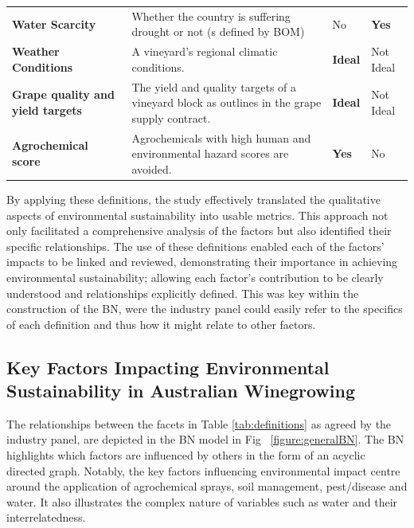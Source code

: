 \begin{table}[h]
\begin{tabular}{@{}llll@{}}
    \textbf{Water Scarcity} & Whether the country is suffering drought or not (s defined by BOM) & No & \textbf{Yes} \\
    \textbf{Weather Conditions} & A vineyard’s regional climatic conditions. & \textbf{Ideal} & Not Ideal \\
    \textbf{Grape quality and yield targets} & The yield and quality targets of a vineyard block as outlines in the grape supply contract. & \textbf{Ideal} & Not Ideal \\
    \textbf{Agrochemical score} & Agrochemicals with high human and environmental hazard scores are avoided. & \textbf{Yes} & No \\ \bottomrule
    \end{tabular}
\end{table}

By applying these definitions, the study effectively translated the qualitative aspects of environmental sustainability into usable metrics. This approach not only facilitated a comprehensive analysis of the factors but also identified their specific relationships. The use of these definitions enabled each of the factors' impacts to be linked and reviewed, demonstrating their importance in achieving environmental sustainability; allowing each factor's contribution to be clearly understood and relationships explicitly defined. This was key within the construction of the BN, were the industry panel could easily refer to the specifics of each definition and thus how it might relate to other factors.

\subsection{Key Factors Impacting Environmental Sustainability in Australian Winegrowing} 

The relationships between the facets in Table \ref{tab:definitions}  as agreed by the industry panel, are depicted in the BN model in Fig ~\ref{figure:generalBN}. The BN highlights which factors are influenced by others in the form of an acyclic directed graph. Notably, the key factors influencing environmental impact centre around the application of agrochemical sprays, soil management, pest/disease and water. It also illustrates the complex nature of variables such as water and their interrelatedness.


